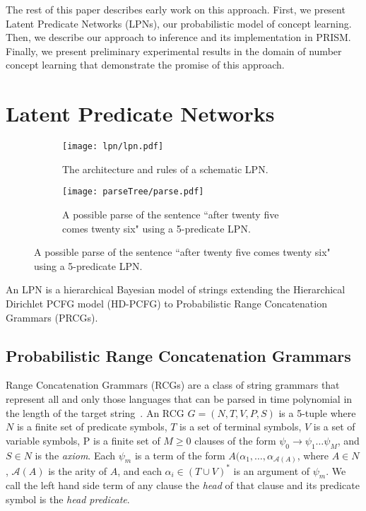 \documentclass{article} %
\begin{document}
The rest of this paper describes early work on this approach. First,
we present Latent Predicate Networks (LPNs), our probabilistic model
of concept learning. Then, we describe our approach to inference and
its implementation in PRISM. Finally, we present preliminary
experimental results in the domain of number concept learning that
demonstrate the promise of this approach.

\section{Latent Predicate Networks}

\begin{figure}[t]
  \begin{subfigure}[b]{0.5\linewidth}
    \texttt{[image: lpn/lpn.pdf]}
    \caption{The architecture and rules of a schematic LPN.}
    \label{fig:architecture}
  \end{subfigure}
  \hfill
  \begin{subfigure}[b]{0.5\linewidth}
    \texttt{[image: parseTree/parse.pdf]}
    \caption{A possible parse of the sentence ``after twenty five comes twenty six" using a 5-predicate LPN.}
    \label{fig:parseexample}
  \end{subfigure}
\end{figure}

An LPN is a hierarchical Bayesian model of strings
extending the Hierarchical Dirichlet PCFG model (HD-PCFG) to
Probabilistic Range Concatenation Grammars (PRCGs). 

\subsection{Probabilistic Range Concatenation Grammars}
Range Concatenation Grammars (RCGs) are a class of string grammars
that represent all and only those languages that can be parsed in time
polynomial in the length of the target
string~\cite{boullier2005range}. An RCG $G=(N, T, V, P, S)$ is a
5-tuple where $N$ is a finite set of predicate symbols, $T$ is a set
of terminal symbols, $V$ is a set of variable symbols, P is a finite
set of $M \geq 0$ clauses of the form $\psi_0 \rightarrow \psi_1 \dots
\psi_M$, and $S \in N$ is the \emph{axiom}. Each $\psi_m$ is a term of
the form $A(\alpha_1, \dots, \alpha_{\mathcal{A}(A)}$, where $A \in
N$, $\mathcal{A}(A)$ is the arity of $A$, and each $\alpha_i \in (T
\cup V)^*$ is an argument of $\psi_m$. We call the left hand side term
of any clause the \emph{head} of that clause and its predicate symbol
is the \emph{head predicate}.
\end{document}
